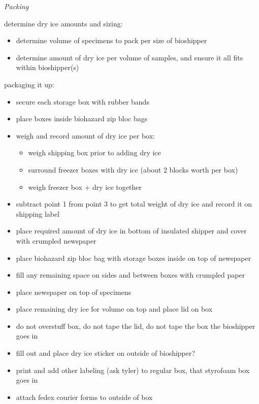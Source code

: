 \documentclass[
]{book}
\providecommand{\tightlist}{%
  \setlength{\itemsep}{0pt}\setlength{\parskip}{0pt}}
\begin{document}
\emph{Packing}

determine dry ice amounts and sizing:

\begin{itemize}
\tightlist
\item
  determine volume of specimens to pack per size of bioshipper
\item
  determine amount of dry ice per volume of samples, and ensure it all fits within bioshipper(s)
\end{itemize}

packaging it up:

\begin{itemize}
\tightlist
\item
  secure each storage box with rubber bands
\item
  place boxes inside biohazard zip bloc bags
\item
  weigh and record amount of dry ice per box:

  \begin{itemize}
  \tightlist
  \item
    weigh shipping box prior to adding dry ice
  \item
    surround freezer boxes with dry ice (about 2 blocks worth per box)
  \item
    weigh freezer box + dry ice together
  \end{itemize}
\item
  subtract point 1 from point 3 to get total weight of dry ice and record it on shipping label
\item
  place required amount of dry ice in bottom of insulated shipper and cover with crumpled newspaper
\item
  place biohazard zip bloc bag with storage boxes inside on top of newspaper
\item
  fill any remaining space on sides and between boxes with crumpled paper
\item
  place newspaper on top of specimens
\item
  place remaining dry ice for volume on top and place lid on box
\item
  do not overstuff box, do not tape the lid, do not tape the box the bioshipper goes in
\item
  fill out and place dry ice sticker on outside of bioshipper?
\item
  print and add other labeling (ask tyler) to regular box, that styrofoam box goes in
\item
  attach fedex courier forms to outside of box
\end{itemize}
\end{document}
